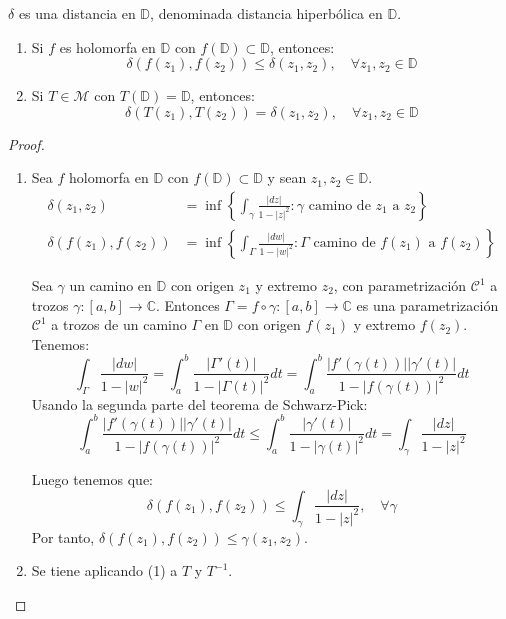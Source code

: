 $\delta$ es una distancia en $\mathbb{D}$, denominada distancia hiperbólica en $\mathbb{D}$.

\begin{proposition}
    \hfill
    \begin{enumerate}
        \item Si $f$ es holomorfa en $\mathbb{D}$ con $f(\mathbb{D}) \subset \mathbb{D}$, entonces:
              $$\delta(f(z_1), f(z_2)) \leq \delta(z_1, z_2), \quad \forall z_1, z_2 \in \mathbb{D}$$
        \item Si $T \in \mathcal{M}$ con $T(\mathbb{D}) = \mathbb{D}$, entonces:
              $$\delta(T(z_1), T(z_2)) = \delta(z_1, z_2), \quad \forall z_1, z_2 \in \mathbb{D}$$
    \end{enumerate}
\end{proposition}

\begin{proof}
    \hfill
    \begin{enumerate}
        \item Sea $f$ holomorfa en $\mathbb{D}$ con $f(\mathbb{D}) \subset \mathbb{D}$ y sean $z_1, z_2 \in \mathbb{D}$.
              \begin{align*}
                  \delta(z_1, z_2)       & = \inf \left\{\int_\gamma \frac{|dz|}{1-|z|^2} : \gamma \text{ camino de } z_1 \text{ a } z_2\right\}       \\
                  \delta(f(z_1), f(z_2)) & = \inf \left\{\int_\Gamma \frac{|dw|}{1-|w|^2} : \Gamma \text{ camino de } f(z_1) \text{ a } f(z_2)\right\}
              \end{align*}

              Sea $\gamma$ un camino en $\mathbb{D}$ con origen $z_1$ y extremo $z_2$, con parametrización $\mathcal{C}^1$ a trozos $\gamma: [a, b] \to \mathbb{C}$.
              Entonces $\Gamma = f \circ \gamma: [a, b] \to \mathbb{C}$ es una parametrización $\mathcal{C}^1$ a trozos de un camino $\Gamma$ en $\mathbb{D}$ con origen $f(z_1)$ y extremo $f(z_2)$.
              Tenemos:
              $$\int_\Gamma \frac{|dw|}{1-|w|^2} = \int_a^b \frac{|\Gamma'(t)|}{1-|\Gamma(t)|^2}dt = \int_a^b \frac{|f'(\gamma(t))||\gamma'(t)|}{1-|f(\gamma(t))|^2}dt$$
              Usando la segunda parte del teorema de Schwarz-Pick:
              $$\int_a^b \frac{|f'(\gamma(t))||\gamma'(t)|}{1-|f(\gamma(t))|^2}dt \leq \int_a^b \frac{|\gamma'(t)|}{1-|\gamma(t)|^2}dt = \int_\gamma \frac{|dz|}{1-|z|^2}$$

              Luego tenemos que:
              $$\delta(f(z_1), f(z_2)) \leq \int_\gamma \frac{|dz|}{1-|z|^2}, \quad \forall \gamma$$
              Por tanto, $\delta(f(z_1), f(z_2)) \leq \gamma(z_1, z_2)$.

        \item Se tiene aplicando (1) a $T$ y $T^{-1}$.
    \end{enumerate}
\end{proof}

